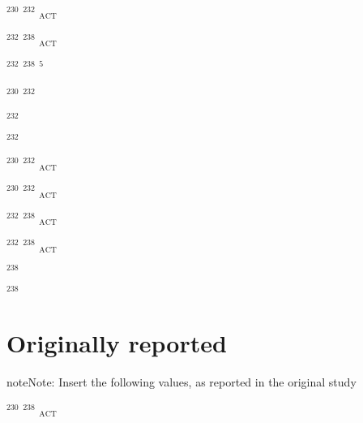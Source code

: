 \documentclass[letterpaper,10pt,english]{sphinxmanual}
\begin{document}
\sphinxstylestrong{{[}} $^{\text{230}}$ $^{\text{232}}$\sphinxstylestrong{Th{]}} $_{\text{ACT}}$

\sphinxstylestrong{{[}} $^{\text{232}}$ $^{\text{238}}$\sphinxstylestrong{U{]}} $_{\text{ACT}}$

 $^{\text{232}}$ $^{\text{238}}$ $^{\text{5}}$

 $^{\text{230}}$ $^{\text{232}}$

\sphinxstylestrong{{[}} $^{\text{232}}$\sphinxstylestrong{Th{]} (ppb)}

\sphinxstylestrong{{[}} $^{\text{232}}$\sphinxstylestrong{Th{]} (ppb) uncertainty (\(\pm\)2\sphinxhyphen{}sigma)}

\sphinxstylestrong{{[}} $^{\text{230}}$ $^{\text{232}}$\sphinxstylestrong{Th{]}} $_{\text{ACT}}$

\sphinxstylestrong{{[}} $^{\text{230}}$ $^{\text{232}}$\sphinxstylestrong{Th{]}} $_{\text{ACT}}$

\sphinxstylestrong{{[}} $^{\text{232}}$ $^{\text{238}}$\sphinxstylestrong{U{]}} $_{\text{ACT}}$

\sphinxstylestrong{{[}} $^{\text{232}}$ $^{\text{238}}$\sphinxstylestrong{U{]}} $_{\text{ACT}}$

\sphinxstylestrong{{[}} $^{\text{238}}$\sphinxstylestrong{U{]} (ppm)}

\sphinxstylestrong{{[}} $^{\text{238}}$\sphinxstylestrong{U{]} (ppm) uncertainty (\(\pm\)2\sphinxhyphen{}sigma)}


\section{Originally reported}
\label{\detokenize{Useries:originally-reported}}
\begin{sphinxadmonition}{note}{Note:}
Insert the following values, as reported in the original study
\end{sphinxadmonition}

\sphinxstylestrong{{[}} $^{\text{230}}$ $^{\text{238}}$\sphinxstylestrong{U{]}} $_{\text{ACT}}$
\end{document}
